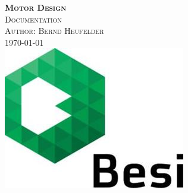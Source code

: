 \documentclass[a4paper, 10pt]{scrartcl}
\begin{document}
	\begin{titlepage}
		\ClearShipoutPicture
		\center 		
		\textsc{\huge \bfseries Motor Design}\\[1cm] 
		\textsc{\Large Documentation}\\[0.5cm] 
		\textsc{\large Author: Bernd Heufelder}\\[0.5cm] 
		{\large \today}\\[1cm] 
		\includegraphics[width=0.3\linewidth]{./pics/BesiLogo.jpg}\\[1cm]
		\begin{flushleft}
			\tableofcontents
		\end{flushleft}
	\end{titlepage}

	
	
	
	
\end{document}
